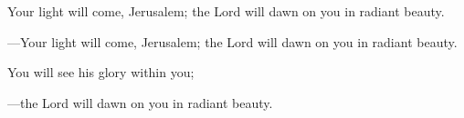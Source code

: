 \responsory

\begin{hangpar}


\medskip Your light will come, Jerusalem;
the Lord will dawn on you in radiant beauty.

{\color{red}---\thinspace }Your light will come, Jerusalem;
the Lord will dawn on you in radiant beauty.

\medskip You will see his glory within you;

{\color{red}---\thinspace }the Lord will dawn on you in radiant beauty.
\end{hangpar}